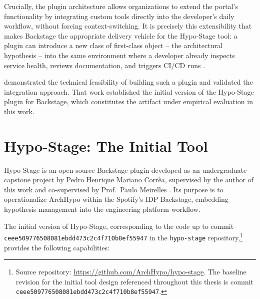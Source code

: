 Crucially, the plugin architecture allows organizations to extend the portal's
functionality by integrating custom tools directly into the developer's daily workflow,
without forcing context-switching. It is precisely this extensibility that makes Backstage
the appropriate delivery vehicle for the Hypo-Stage tool: a plugin can introduce a new class of
first-class object -- the architectural hypothesis -- into the same environment where a
developer already inspects service health, reviews documentation, and triggers CI/CD
runs \citep{correa2025}.

\citet{correa2025} demonstrated the technical feasibility of building such a plugin
and validated the integration approach. That work established the initial version of
the Hypo-Stage plugin for Backstage, which constitutes the artifact under empirical evaluation in this work.

\section{Hypo-Stage: The Initial Tool}
\label{sec:hypo-stage}

Hypo-Stage is an open-source Backstage plugin developed
as an undergraduate capstone project by Pedro Henrique Mariano Corrêa, supervised by
the author of this work and co-supervised by Prof.\ Paulo
Meirelles \citep{correa2025}. Its purpose is to operationalize ArchHypo within the Spotify's IDP Backstage, embedding hypothesis management into the engineering platform workflow.

The initial version of Hypo-Stage, corresponding to the code up to commit
\texttt{ceee509776508081ebdd473c2c4f710b8ef55947} in the \texttt{hypo-stage}
repository,\footnote{Source repository: \url{https://github.com/ArchHypo/hypo-stage}. The baseline revision for the initial tool design referenced throughout this thesis is commit \texttt{ceee509776508081ebdd473c2c4f710b8ef55947}.} provides the
following capabilities:

